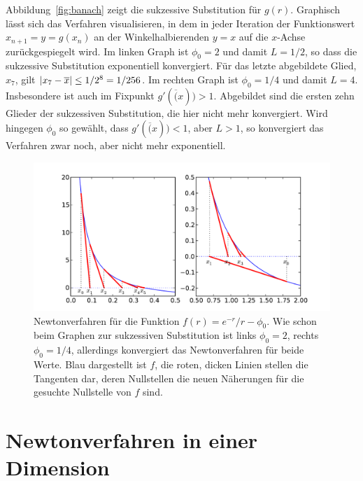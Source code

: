 Abbildung~\ref{fig:banach} zeigt die sukzessive Substitution für
$g(r)$. Graphisch lässt sich das Verfahren visualisieren, in dem in
jeder Iteration der Funktionswert $x_{n+1} = y =g(x_{n})$ an der
Winkelhalbierenden $y=x$ auf die $x$-Achse zurückgespiegelt wird. Im
linken Graph ist $\phi_0=2$ und damit $L=1/2$, so dass die sukzessive
Substitution exponentiell konvergiert. Für das letzte abgebildete
Glied, $x_7$, gilt $\left\lvert{x_7-\overline{x}}\right\rvert \le 1/2^8 = 1/256$. Im
rechten Graph ist $\phi_0=1/4$ und damit $L=4$. Insbesondere ist auch
im Fixpunkt $g'(\overline(x))>1$. Abgebildet sind die ersten zehn
Glieder der sukzessiven Substitution, die hier nicht mehr
konvergiert. Wird hingegen $\phi_0$ so gewählt, dass 
$g'(\overline(x))<1$, aber $L>1$, so konvergiert das Verfahren zwar
noch, aber nicht mehr exponentiell.

\begin{figure}
  \centering
  \includegraphics[width=\textwidth]{plots/newton}
  \caption{Newtonverfahren für die Funktion $f(r) = e^{-r}/r -
    \phi_0$. Wie schon beim Graphen zur sukzessiven Substitution ist
    links $\phi_0=2$, rechts $\phi_0=1/4$, allerdings konvergiert das
    Newtonverfahren für beide Werte. Blau dargestellt ist $f$, die
    roten, dicken Linien stellen die Tangenten dar, deren Nullstellen
    die neuen Näherungen für die gesuchte Nullstelle von $f$ sind.}
  \label{fig:newton}
\end{figure}

\section{Newtonverfahren in einer Dimension}

